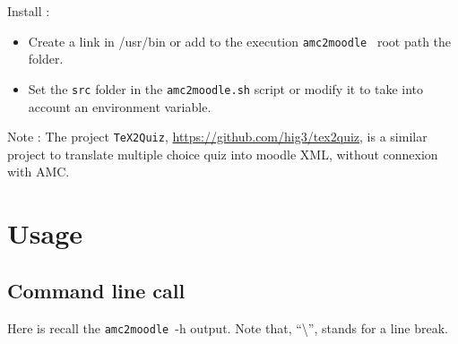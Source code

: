 \documentclass[a4paper]{article}
\newcommand{\amc}{\texttt{amc2moodle}}
\begin{document}
Install :
\begin{itemize}
     \item Create a link in /usr/bin or add to the execution \amc~ root path the folder.
     \item Set the \texttt{src} folder in the \texttt{amc2moodle.sh} script or modify it to take into account an environment variable.
\end{itemize} 


Note : The project \texttt{TeX2Quiz}, \url{https://github.com/hig3/tex2quiz}, is a similar project to translate multiple choice quiz into moodle XML, without connexion with AMC.


\section{Usage}
\subsection{Command line call}
Here is recall the \amc~-h output. Note that, ``\textbackslash'', stands for a line break.

\end{document}
